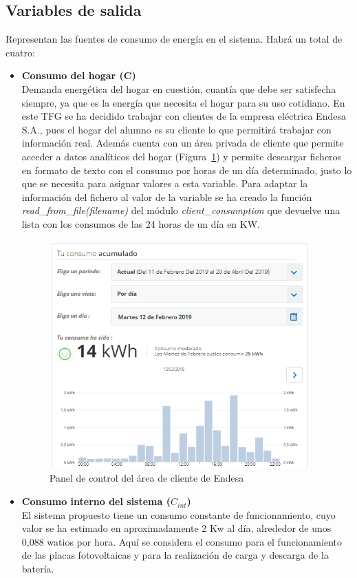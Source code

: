 \subsection{Variables de salida}
Representan las fuentes de consumo de energía en el sistema. Habrá un total de cuatro:
\begin{itemize}
\item \textbf{Consumo del hogar (C)}\\Demanda energética del hogar en cuestión, cuantía que debe ser satisfecha siempre, ya que es la energía que necesita el hogar para su uso cotidiano. En este \gls{TFG} se ha decidido trabajar con clientes de la empresa eléctrica Endesa S.A., pues el hogar del alumno es su cliente lo que permitirá trabajar con información real. Además cuenta con un área privada de cliente que permite acceder a datos analíticos del hogar (Figura~\ref{fig:endesa}) y permite descargar ficheros en formato de texto con el consumo por horas de un día determinado, justo lo que se necesita para asignar valores a esta variable. Para adaptar la información del fichero al valor de la variable se ha creado la función \textit{read\_from\_file(filename)} del módulo \textit{client\_consumption} que devuelve una lista con los consumos de las 24 horas de un día en KW.
  \begin{figure}[H]
    \centering
    \includegraphics[width=10cm]{figs/Endesa.PNG}
    \caption{Panel de control del área de cliente de Endesa}
    \label{fig:endesa}
  \end{figure}
\item \textbf{Consumo interno del sistema ($ C_{int} $)}\\El sistema propuesto tiene un consumo constante de funcionamiento, cuyo valor se ha estimado en aproximadamente 2 Kw al día, alrededor de unos 0,088 watios por hora. Aquí se considera el consumo para el funcionamiento de las placas fotovoltaicas y para la realización de carga y descarga de la batería.

\end{itemize}
